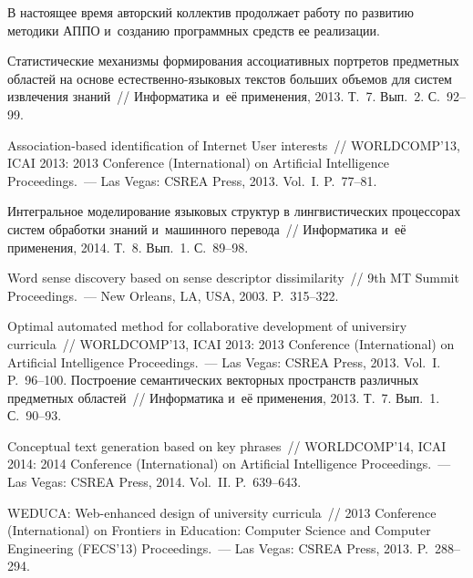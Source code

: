 \begin{multicols}{2}
     В настоящее время авторский коллектив продолжает работу по
развитию методики АППО и~созданию программных средств ее реализации.

{\small\frenchspacing
 {%
 \begin{thebibliography}{99}
 Статистические механизмы формирования
ассоциативных портретов предметных областей на основе
ес\-те\-ст\-вен\-но-язы\-ко\-вых текстов больших объемов для систем
извлечения знаний~// Информатика и~её применения, 2013. Т.~7. Вып.~2.
С.~92--99.

 Association-based identification of
Internet User interests~// WORLDCOMP'13, ICAI 2013: 2013 Conference
(International) on Artificial Intelligence Proceedings.~--- Las Vegas: CSREA
Press, 2013. Vol.~I. P.~77--81.

 Интегральное моделирование языковых структур
в лингвистических процессорах систем обработки знаний и~машинного
перевода~// Информатика и~её применения, 2014. Т.~8. Вып.~1.
С.~89--98.

 Word sense discovery based on sense descriptor dissimilarity~// 9th
MT Summit Proceedings.~--- New Orleans, LA, USA, 2003. P.~315--322.

 Optimal automated method for collaborative
development of universiry curricula~// WORLDCOMP'13, ICAI 2013: 2013
Conference (International) on Artificial Intelligence Proceedings.~--- Las Vegas:
CSREA Press, 2013. Vol.~I. P.~96--100.
 Построение семантических векторных пространств
различных предметных областей~// Информатика и~её применения, 2013.
Т.~7. Вып.~1. С.~90--93.

 Conceptual text generation based on
key phrases~// WORLDCOMP'14, ICAI 2014:  2014 Conference (International)
on Artificial Intelligence Proceedings.~--- Las Vegas: CSREA Press, 2014.
Vol.~II. P.~639--643.


 WEDUCA: Web-enhanced design of university curricula~//  2013
Conference (International) on Frontiers in Education: Computer Science and
Computer Engineering (FECS'13) Proceedings.~--- Las Vegas: CSREA Press,
2013. P.~288--294.


\end{thebibliography}}}
\end{multicols}
